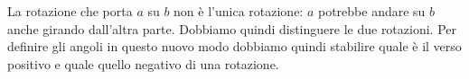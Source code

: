  \begin{minipage}[t]{.45\textwidth}
\begin{inaccessibleblock}
\begin{center}
 
\end{center}
\end{inaccessibleblock}
 \end{minipage}
 \begin{minipage}[t]{.45\textwidth}
\begin{inaccessibleblock}
\begin{center}
 
\end{center}
\end{inaccessibleblock}
 \end{minipage}

La rotazione che porta $a$ su $b$  non è 
l'unica rotazione: $a$ potrebbe andare su $b$ anche girando dall'altra 
parte. Dobbiamo quindi distinguere le due 
rotazioni.
Per definire gli angoli in questo nuovo modo dobbiamo quindi stabilire quale 
è il verso positivo e quale quello negativo di una rotazione.

%     

